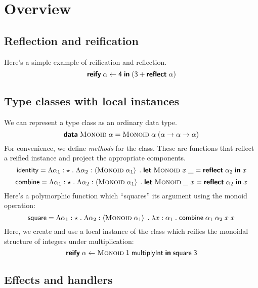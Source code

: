 \section{Overview}

  \subsection{Reflection and reification}

    Here's a simple example of reification and reflection.
    \[ \textsf{\textbf{reify}} \; \alpha \leftarrow \textsf{4} \; \textsf{\textbf{in}} \; \mathopen{}\left( \textsf{3} + \textsf{\textbf{reflect}} \; \alpha \right)\mathclose{} \]

  \subsection{Type classes with local instances}

    We can represent a type class as an ordinary data type.
    \[ \textsf{\textbf{data}} \; \textsf{\textsc{Monoid}} \; \alpha = \textsf{\textsc{Monoid}} \; \alpha \; \mathopen{}\left( \alpha \rightarrow \alpha \rightarrow \alpha \right)\mathclose{} \]
    For convenience, we define \emph{methods} for the class. These are functions that reflect a reified instance and project the appropriate components.
    \[ \textsf{identity} = \Lambda \alpha_1 : \star \; . \; \Lambda \alpha_2 : \left\langle \textsf{\textsc{Monoid}} \; \alpha_1 \right\rangle \; . \; \textsf{\textbf{let}} \; \textsf{\textsc{Monoid}} \; x \; \_ = \textsf{\textbf{reflect}} \; \alpha_2 \; \textsf{\textbf{in}} \; x \]
    \[ \textsf{combine} = \Lambda \alpha_1 : \star \; . \; \Lambda \alpha_2 : \left\langle \textsf{\textsc{Monoid}} \; \alpha_1 \right\rangle \; . \; \textsf{\textbf{let}} \; \textsf{\textsc{Monoid}} \; \_ \; x = \textsf{\textbf{reflect}} \; \alpha_2 \; \textsf{\textbf{in}} \; x \]
    Here's a polymorphic function which ``squares'' its argument using the monoid operation:
    \[ \textsf{square} = \Lambda \alpha_1 : \star \; . \; \Lambda \alpha_2 : \left\langle \textsf{\textsc{Monoid}} \; \alpha_1 \right\rangle \; . \; \lambda x : \alpha_1 \; . \; \textsf{combine} \; \alpha_1 \; \alpha_2 \; x \; x \]
    Here, we create and use a local instance of the class which reifies the monoidal structure of integers under multiplication:
    \[ \textsf{\textbf{reify}} \; \alpha \leftarrow \textsf{\textsc{Monoid}} \; \textsf{1} \; \textsf{multiplyInt} \; \textsf{\textbf{in}} \; \textsf{square} \; \textsf{3} \]

  \subsection{Effects and handlers}
